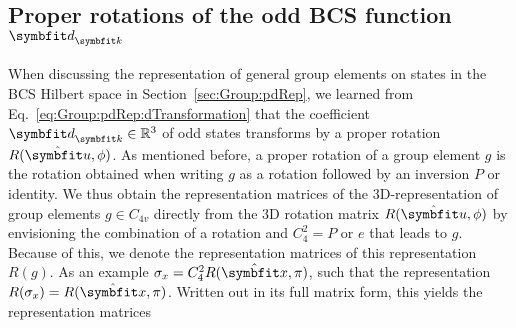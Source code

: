 \subsection{Proper rotations of the odd BCS function $\v{d}_\v{k}$}
\label{sec:Group:Symm:dRepresentation}

When discussing the representation of general group elements on states in the BCS Hilbert space in Section~\ref{sec:Group:pdRep}, we learned from
Eq.~\eqref{eq:Group:pdRep:dTransformation} that the coefficient $\v{d}_\v{k}\in\mathbb{R}^3$ of odd states transforms by a proper rotation $R(\hat{\v{u}},\phi)$.
As mentioned before, a proper rotation of a group element $g$ is the rotation obtained when writing $g$ as a rotation followed by an inversion $P$ or identity. We thus
obtain the representation matrices of the $3$D-representation of group elements $g\in C_{4v}$ directly from the $3$D rotation matrix $R(\hat{\v{u}},\phi)$ by
envisioning the combination of a rotation and $C_{4}^2=P$ or $e$ that leads to $g$. Because of this, we denote the representation matrices of this
representation $R(g)$. As an example $\sigma_x = C_4^2R(\hat{\v{x}},\pi)$, such that the representation $R(\sigma_x) = R(\hat{\v{x}},\pi)$. Written
out in its full matrix form, this yields the representation matrices
%
